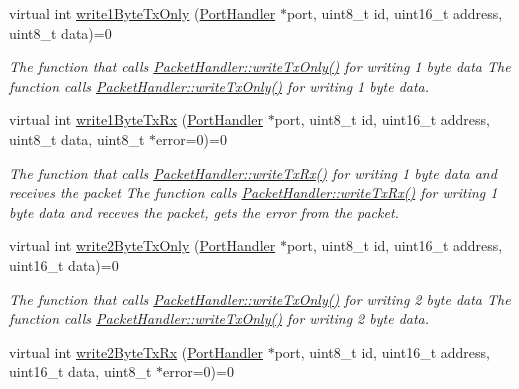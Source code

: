 \begin{DoxyCompactItemize}
virtual int \hyperlink{classmercury_1_1_packet_handler_a21553798faa86c41203ab41a5c930938}{write1\+Byte\+Tx\+Only} (\hyperlink{classmercury_1_1_port_handler}{Port\+Handler} $\ast$port, uint8\+\_\+t id, uint16\+\_\+t address, uint8\+\_\+t data)=0
\begin{DoxyCompactList}\small\item\em The function that calls \hyperlink{classmercury_1_1_packet_handler_acf4e01987186250221603f794e7e4b59}{Packet\+Handler\+::write\+Tx\+Only()} for writing 1 byte data  The function calls \hyperlink{classmercury_1_1_packet_handler_acf4e01987186250221603f794e7e4b59}{Packet\+Handler\+::write\+Tx\+Only()} for writing 1 byte data. \end{DoxyCompactList}\item 
virtual int \hyperlink{classmercury_1_1_packet_handler_a23576f2a57fb0bb66797b8a3a1935cd1}{write1\+Byte\+Tx\+Rx} (\hyperlink{classmercury_1_1_port_handler}{Port\+Handler} $\ast$port, uint8\+\_\+t id, uint16\+\_\+t address, uint8\+\_\+t data, uint8\+\_\+t $\ast$error=0)=0
\begin{DoxyCompactList}\small\item\em The function that calls \hyperlink{classmercury_1_1_packet_handler_adf35a5000d465bd5426530e34a91a21d}{Packet\+Handler\+::write\+Tx\+Rx()} for writing 1 byte data and receives the packet  The function calls \hyperlink{classmercury_1_1_packet_handler_adf35a5000d465bd5426530e34a91a21d}{Packet\+Handler\+::write\+Tx\+Rx()} for writing 1 byte data and receves the packet,  gets the error from the packet. \end{DoxyCompactList}\item 
virtual int \hyperlink{classmercury_1_1_packet_handler_a417e5e07c5592d3dc524da4b4c829fb4}{write2\+Byte\+Tx\+Only} (\hyperlink{classmercury_1_1_port_handler}{Port\+Handler} $\ast$port, uint8\+\_\+t id, uint16\+\_\+t address, uint16\+\_\+t data)=0
\begin{DoxyCompactList}\small\item\em The function that calls \hyperlink{classmercury_1_1_packet_handler_acf4e01987186250221603f794e7e4b59}{Packet\+Handler\+::write\+Tx\+Only()} for writing 2 byte data  The function calls \hyperlink{classmercury_1_1_packet_handler_acf4e01987186250221603f794e7e4b59}{Packet\+Handler\+::write\+Tx\+Only()} for writing 2 byte data. \end{DoxyCompactList}\item 
virtual int \hyperlink{classmercury_1_1_packet_handler_a5beac405c8ea75cc82ea5c01867a45db}{write2\+Byte\+Tx\+Rx} (\hyperlink{classmercury_1_1_port_handler}{Port\+Handler} $\ast$port, uint8\+\_\+t id, uint16\+\_\+t address, uint16\+\_\+t data, uint8\+\_\+t $\ast$error=0)=0

\end{DoxyCompactItemize}
